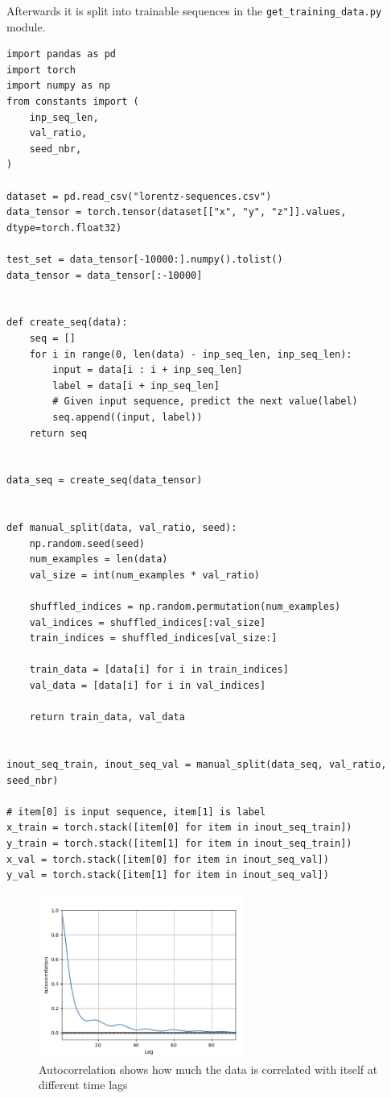 \documentclass[11pt]{article}
\begin{document}
Afterwards it is split into trainable sequences in the \texttt{get\_training\_data.py} module.
\begin{lstlisting}
import pandas as pd
import torch
import numpy as np
from constants import (
    inp_seq_len,
    val_ratio,
    seed_nbr,
)

dataset = pd.read_csv("lorentz-sequences.csv")
data_tensor = torch.tensor(dataset[["x", "y", "z"]].values, dtype=torch.float32)

test_set = data_tensor[-10000:].numpy().tolist()
data_tensor = data_tensor[:-10000]


def create_seq(data):
    seq = []
    for i in range(0, len(data) - inp_seq_len, inp_seq_len):
        input = data[i : i + inp_seq_len]
        label = data[i + inp_seq_len]
        # Given input sequence, predict the next value(label)
        seq.append((input, label))
    return seq


data_seq = create_seq(data_tensor)


def manual_split(data, val_ratio, seed):
    np.random.seed(seed)
    num_examples = len(data)
    val_size = int(num_examples * val_ratio)

    shuffled_indices = np.random.permutation(num_examples)
    val_indices = shuffled_indices[:val_size]
    train_indices = shuffled_indices[val_size:]

    train_data = [data[i] for i in train_indices]
    val_data = [data[i] for i in val_indices]

    return train_data, val_data


inout_seq_train, inout_seq_val = manual_split(data_seq, val_ratio, seed_nbr)

# item[0] is input sequence, item[1] is label
x_train = torch.stack([item[0] for item in inout_seq_train])
y_train = torch.stack([item[1] for item in inout_seq_train])
x_val = torch.stack([item[0] for item in inout_seq_val])
y_val = torch.stack([item[1] for item in inout_seq_val])

\end{lstlisting}

\begin{figure}[h]
\centering
\includegraphics[width=0.6\textwidth]{auto_correlation.png}
\caption{Autocorrelation shows how much the data is correlated with itself at different time lags}
\end{figure}
\end{document}

